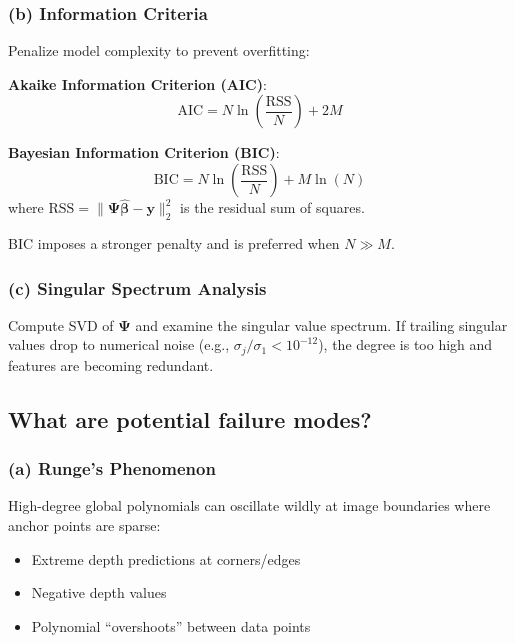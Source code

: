 \documentclass[11pt,a4paper]{article}
\begin{document}
\subsubsection{(b) Information Criteria}

Penalize model complexity to prevent overfitting:

\textbf{Akaike Information Criterion (AIC)}:
\begin{equation}
\text{AIC} = N \ln\left(\frac{\text{RSS}}{N}\right) + 2M
\end{equation}

\textbf{Bayesian Information Criterion (BIC)}:
\begin{equation}
\text{BIC} = N \ln\left(\frac{\text{RSS}}{N}\right) + M \ln(N)
\end{equation}
where $\text{RSS} = \|\boldsymbol{\Psi}\hat{\boldsymbol{\beta}} - \mathbf{y}\|_2^2$ is the residual sum of squares.

BIC imposes a stronger penalty and is preferred when $N \gg M$.

\subsubsection{(c) Singular Spectrum Analysis}

Compute SVD of $\boldsymbol{\Psi}$ and examine the singular value spectrum. If trailing singular values drop to numerical noise (e.g., $\sigma_j / \sigma_1 < 10^{-12}$), the degree is too high and features are becoming redundant.

\subsection{What are potential failure modes?}

\subsubsection{(a) Runge's Phenomenon}

High-degree global polynomials can oscillate wildly at image boundaries where anchor points are sparse:
\begin{itemize}[noitemsep]
    \item Extreme depth predictions at corners/edges
    \item Negative depth values
    \item Polynomial ``overshoots'' between data points
\end{itemize}
\end{document}
